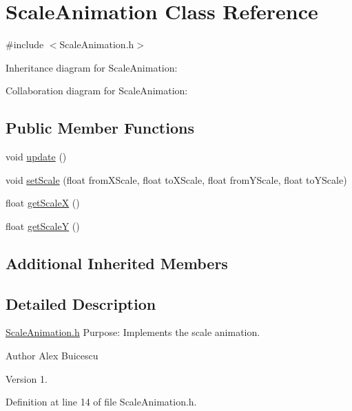 \hypertarget{class_scale_animation}{}\section{Scale\+Animation Class Reference}
\label{class_scale_animation}


{\ttfamily \#include $<$Scale\+Animation.\+h$>$}



Inheritance diagram for Scale\+Animation\+:


Collaboration diagram for Scale\+Animation\+:
\subsection*{Public Member Functions}
\begin{DoxyCompactItemize}
\item 
void \hyperlink{class_scale_animation_aaebd2e003860789ed140d42bd87e68bb}{update} ()
\item 
void \hyperlink{class_scale_animation_a61fdc6747bc083b1996631aaa5b4f9d6}{set\+Scale} (float from\+X\+Scale, float to\+X\+Scale, float from\+Y\+Scale, float to\+Y\+Scale)
\item 
float \hyperlink{class_scale_animation_a97140365f1aa1c3696c7ba70b4a8e576}{get\+Scale\+X} ()
\item 
float \hyperlink{class_scale_animation_ae34d86884bad6845b56de7e3cdb9de61}{get\+Scale\+Y} ()
\end{DoxyCompactItemize}
\subsection*{Additional Inherited Members}


\subsection{Detailed Description}
\hyperlink{_scale_animation_8h_source}{Scale\+Animation.\+h} Purpose\+: Implements the scale animation.

\begin{DoxyAuthor}{Author}
Alex Buicescu 
\end{DoxyAuthor}
\begin{DoxyVersion}{Version}
1. 
\end{DoxyVersion}


Definition at line 14 of file Scale\+Animation.\+h.




